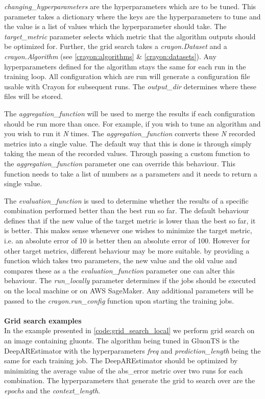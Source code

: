 \textit{changing\_hyperparameters} are the hyperparameters which are to be tuned. This parameter takes a dictionary where the keys are the hyperparameters to tune and the value is a list of values which the hyperparameter should take. The \textit{target\_metric} parameter selects which metric that the algorithm outputs should be optimized for. Further, the grid search takes a \textit{crayon.Dataset} and a \textit{crayon.Algorithm} (see \ref{crayon:algorithms} \& \ref{crayon:datasets}). Any hyperparameters defined for the algorithm stays the same for each run in the training loop. All configuration which are run will generate a configuration file usable with Crayon for subsequent runs. The \textit{output\_dir} determines where these files will be stored. 

The \textit{aggregation\_function} will be used to merge the results if each configuration should be run more than once. For example, if you wish to tune an algorithm and you wish to run it \textit{N} times. The \textit{aggregation\_function} converts these \textit{N} recorded metrics into a single value. The default way that this is done is through simply taking the mean of the recorded values. Through passing a custom function to the \textit{aggregation\_function} parameter one can override this behaviour. This function needs to take a list of numbers as a parameters and it needs to return a single value.

The \textit{evaluation\_function} is used to determine whether the results of a specific combination performed better than the best run so far. The default behaviour defines that if the new value of the target metric is lower than the best so far, it is better. This makes sense whenever one wishes to minimize the target metric, i.e. an absolute error of 10 is better then an absolute error of 100. However for other target metrics, different behaviour may be more suitable. by providing a function which takes two parameters, the new value and the old value and compares these as a the \textit{evaluation\_function} parameter one can alter this behaviour. The \textit{run\_locally} parameter determines if the jobs should be executed on the local machine or on AWS SageMaker.
Any additional parameters will be passed to the \textit{crayon.run\_config} function upon starting the training jobs. 
\\
\\
\textbf{Grid search examples}
\\
In the example presented in \ref{code:grid_search_local} we perform grid search on an image containing gluonts. The algorithm being tuned in GluonTS is the DeepAREstimator with the hyperparameters \textit{freq} and \textit{prediction\_length} being the same for each training job. The DeepAREstimator should be optimized by minimizing the average value of the abs\_error metric over two runs for each combination. The hyperparameters that generate the grid to search over are the \textit{epochs} and the \textit{context\_length}.

